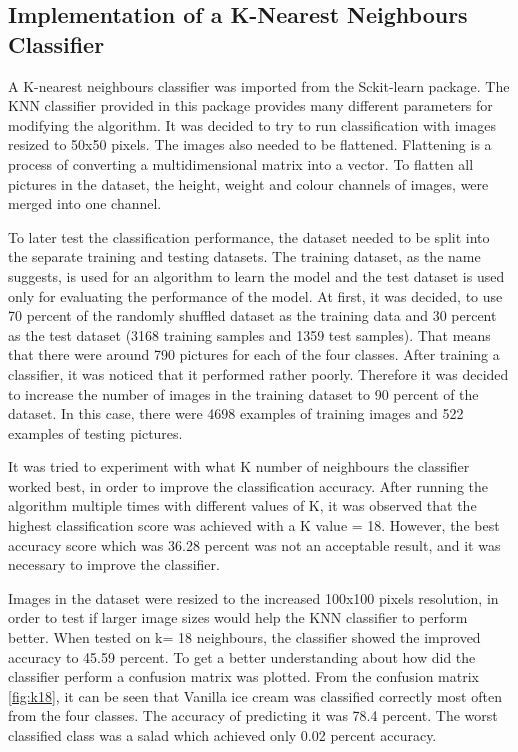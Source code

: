 \subsection{Implementation of a K-Nearest Neighbours Classifier}
 A K-nearest neighbours classifier was imported from the Sckit-learn package. The KNN classifier provided in this package provides many different parameters for modifying the algorithm.  It was decided to try to run classification with images resized to 50x50 pixels. The images also needed to be flattened. Flattening is a process of converting a multidimensional matrix into a vector. To flatten all pictures in the dataset, the height, weight and colour channels of images, were merged into one channel.

 To later test the classification performance, the dataset needed to be split into the separate training and testing datasets. The training dataset, as the name suggests, is used for an algorithm to learn the model and the test dataset is used only for evaluating the performance of the model. At first, it was decided, to use 70 percent of the randomly shuffled dataset as the training data and 30 percent as the test dataset (3168 training samples and 1359 test samples). That means that there were around 790 pictures for each of the four classes. After training a classifier, it was noticed that it performed rather poorly. Therefore it was decided to increase the number of images in the training dataset to 90 percent of the dataset. In this case, there were 4698 examples of training images and 522 examples of testing pictures.
 
It was tried to experiment with what K number of neighbours the classifier worked best, in order to improve the classification accuracy. After running the algorithm multiple times with different values of K, it was observed that the highest classification score was achieved with a K value = 18. However, the best accuracy score which was 36.28 percent was not an acceptable result, and it was necessary to improve the classifier.

 Images in the dataset were resized to the increased 100x100 pixels resolution, in order to test if larger image sizes would help the KNN classifier to perform better. When tested on k= 18 neighbours, the classifier showed the improved accuracy to 45.59 percent. To get a better understanding about how did the classifier perform a confusion matrix was plotted. From the confusion matrix \autoref{fig:k18}, it can be seen that Vanilla ice cream was classified correctly most often from the four classes. The accuracy of predicting it was 78.4 percent. The worst classified class was a salad which achieved only 0.02 percent accuracy.


